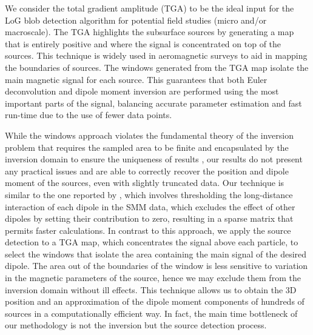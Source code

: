 We consider the total gradient amplitude (TGA) to be the ideal input for the LoG blob detection algorithm for potential field studies (micro and/or macroscale).
The TGA highlights the subsurface sources by generating a map that is entirely positive and where the signal is concentrated on top of the sources.
This technique is widely used in aeromagnetic surveys to aid in mapping the boundaries of sources.
The windows generated from the TGA map isolate the main magnetic signal for each source. This guarantees that both Euler deconvolution and dipole moment inversion are performed using the most important parts of the signal, balancing accurate parameter estimation and fast run-time due to the use of fewer data points.

While the windows approach violates the fundamental theory of the inversion problem that requires the sampled area to be finite and encapsulated by the inversion domain to ensure the uniqueness of results \citep{Baratchart2013, Lima2013}, our results do not present any practical issues and are able to correctly recover the position and dipole moment of the sources, even with slightly truncated data.
Our technique is similar to the one reported by \cite{Weiss2007},
which involves thresholding the long-distance interaction
of each dipole in the SMM data, which excludes the effect of other dipoles by setting their contribution to zero, resulting in a sparse matrix that permits faster calculations.
In contrast to this approach, we apply the source detection to a TGA map, which concentrates the signal above each particle, to select the windows that isolate the area containing the main signal of the desired dipole. The area out of the boundaries of the window is less sensitive to variation in the magnetic parameters of the source, hence we may exclude them from the inversion domain without ill effects.
This technique allows us to obtain the 3D position and an approximation of the dipole moment components of hundreds of sources in a computationally efficient way.
In fact, the main time bottleneck of our methodology is not the inversion but the source detection process.

